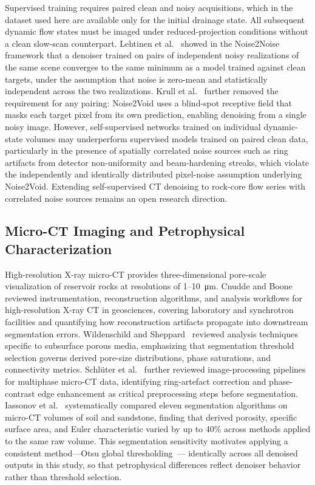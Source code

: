 \documentclass[review,12pt]{elsarticle}
\begin{document}
Supervised training requires paired clean and noisy acquisitions, which
in the dataset used here are available only for the initial drainage
state.  All subsequent dynamic flow states must be imaged under
reduced-projection conditions without a clean slow-scan counterpart.
Lehtinen et al.~\cite{Lehtinen2018noise2noise} showed in the Noise2Noise
framework that a denoiser trained on pairs of independent noisy
realizations of the same scene converges to the same minimum as a model
trained against clean targets, under the assumption that noise is
zero-mean and statistically independent across the two realizations.
Krull et al.~\cite{Krull2019noise2void} further removed the requirement
for any pairing: Noise2Void uses a blind-spot receptive field that masks
each target pixel from its own prediction, enabling denoising from a
single noisy image.  However, self-supervised networks trained on
individual dynamic-state volumes may underperform supervised models
trained on paired clean data, particularly in the presence of spatially
correlated noise sources such as ring artifacts from detector
non-uniformity and beam-hardening streaks, which violate the
independently and identically distributed pixel-noise assumption
underlying Noise2Void.  Extending self-supervised CT denoising to
rock-core flow series with correlated noise sources remains an open
research direction.

\subsection{Micro-CT Imaging and Petrophysical Characterization}
\label{sec:related:microct}

High-resolution X-ray micro-CT provides three-dimensional pore-scale
visualization of reservoir rocks at resolutions of 1--10~\si{\micro\meter}.
Cnudde and Boone~\cite{Cnudde2013} reviewed instrumentation,
reconstruction algorithms, and analysis workflows for high-resolution
X-ray CT in geosciences, covering laboratory and synchrotron facilities
and quantifying how reconstruction artifacts propagate into downstream
segmentation errors.  Wildenschild and Sheppard~\cite{Wildenschild2013}
reviewed analysis techniques specific to subsurface porous media,
emphasizing that segmentation threshold selection governs derived
pore-size distributions, phase saturations, and connectivity metrics.
Schl\"{u}ter et al.~\cite{Schluter2014} further reviewed image-processing
pipelines for multiphase micro-CT data, identifying ring-artefact
correction and phase-contrast edge enhancement as critical preprocessing
steps before segmentation.
Iassonov et al.~\cite{Iassonov2009} systematically compared eleven
segmentation algorithms on micro-CT volumes of soil and sandstone,
finding that derived porosity, specific surface area, and Euler
characteristic varied by up to 40\% across methods applied to the same
raw volume.  This segmentation sensitivity motivates applying a
consistent method---Otsu global thresholding~\cite{Otsu1979}---
identically across all denoised outputs in this study, so that
petrophysical differences reflect denoiser behavior rather than
threshold selection.
\end{document}
